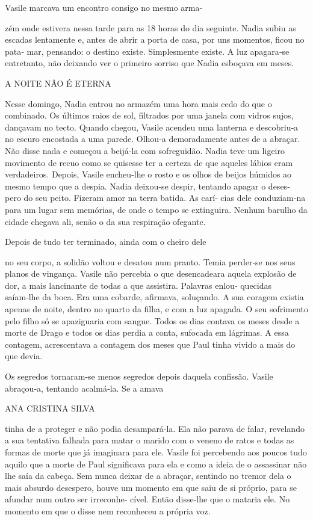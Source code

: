 Vasile marcava um encontro consigo no mesmo arma‑

zém onde estivera nessa tarde para as 18 horas do dia seguinte. Nadia
subiu as escadas lentamente e, antes de abrir a porta de casa, por uns
momentos, ficou no pata‑ mar, pensando: o destino existe. Simplesmente
existe. A luz apagara‑se entretanto, não deixando ver o primeiro sorriso
que Nadia esboçava em meses.

A NOITE NÃO É ETERNA

Nesse domingo, Nadia entrou no armazém uma hora mais cedo do que o
combinado. Os últimos raios de sol, filtrados por uma janela com vidros
sujos, dançavam no tecto. Quando chegou, Vasile acendeu uma lanterna e
descobriu‑a no escuro encostada a uma parede. Olhou‑a demoradamente
antes de a abraçar. Não disse nada e começou a beijá‑la com sofreguidão.
Nadia teve um ligeiro movimento de recuo como se quisesse ter a certeza
de que aqueles lábios eram verdadeiros. Depois, Vasile encheu‑lhe o
rosto e os olhos de beijos húmidos ao mesmo tempo que a despia. Nadia
deixou‑se despir, tentando apagar o deses‑ pero do seu peito. Fizeram
amor na terra batida. As carí‑ cias dele conduziam‑na para um lugar sem
memórias, de onde o tempo se extinguira. Nenhum barulho da cidade
chegava ali, senão o da sua respiração ofegante.

Depois de tudo ter terminado, ainda com o cheiro dele

no seu corpo, a solidão voltou e desatou num pranto. Temia perder‑se nos
seus planos de vingança. Vasile não percebia o que desencadeara aquela
explosão de dor, a mais lancinante de todas a que assistira. Palavras
enlou‑ quecidas saíam‑lhe da boca. Era uma cobarde, afirmava, soluçando.
A sua coragem existia apenas de noite, dentro no quarto da filha, e com
a luz apagada. O seu sofrimento pelo filho só se apaziguaria com sangue.
Todos os dias contava os meses desde a morte de Drago e todos os dias
perdia a conta, sufocada em lágrimas. A essa contagem, acrescentava a
contagem dos meses que Paul tinha vivido a mais do que devia.

Os segredos tornaram‑se menos segredos depois daquela confissão. Vasile
abraçou‑a, tentando acalmá‑la. Se a amava

ANA CRISTINA SILVA

tinha de a proteger e não podia desampará‑la. Ela não parava de falar,
revelando a sua tentativa falhada para matar o marido com o veneno de
ratos e todas as formas de morte que já imaginara para ele. Vasile foi
percebendo aos poucos tudo aquilo que a morte de Paul significava para
ela e como a ideia de o assassinar não lhe saía da cabeça. Sem nunca
deixar de a abraçar, sentindo no tremor dela o mais absurdo desespero,
houve um momento em que saiu de si próprio, para se afundar num outro
ser irreconhe‑ cível. Então disse‑lhe que o mataria ele. No momento em
que o disse nem reconheceu a própria voz.


